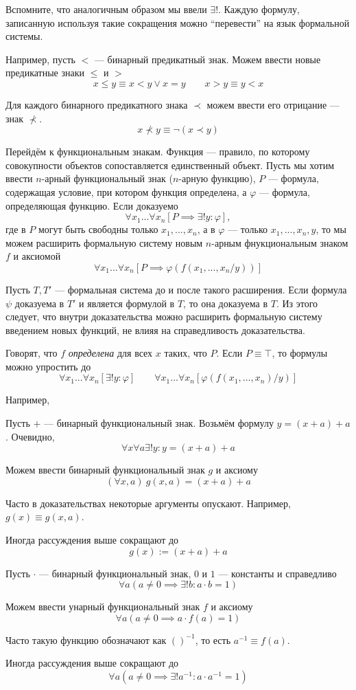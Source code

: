 Вспомните, что аналогичным образом мы ввели $\exists!$. Каждую формулу,
записанную используя такие сокращения можно
``перевести'' на язык формальной системы.

Например, пусть $<$ --- бинарный предикатный знак.
Можем ввести новые предикатные знаки $\leq$ и $>$
\[
	x\leq y\equiv x<y\lor x=y\qquad x>y\equiv y< x
\]

Для каждого бинарного предикатного знака $\prec$ можем
ввести его отрицание --- знак $\nprec$.
\[
	x\nprec y\equiv \lnot(x\prec y)
\]

Перейдём к функциональным знакам. Функция --- правило, по которому совокупности
объектов сопоставляется единственный объект. Пусть мы хотим ввести $n$-арный
функциональный знак ($n$-арную функцию), $P$ --- формула, содержащая
условие, при котором функция определена, а $\varphi$ --- формула, определяющая
функцию. Если доказуемо
\[
	\forall x_1...\forall x_n[P\implies \exists! y:\varphi],
\]
где в $P$ могут быть свободны только $x_1,...,x_{n}$, а в $\varphi$ --- только
$x_1,...,x_{n},y$,
то мы можем расширить формальную систему новым $n$-арным фнукциональным знаком $f$
и аксиомой
\[
	\forall x_1...\forall x_{n}[P\implies \varphi(f(x_1,...,x_{n}/y))]
\]

Пусть $T,T'$ --- формальная система до и после такого расширения.
Если формула $\psi$ доказуема в $T'$ и является формулой в $T$, то она доказуема в $T$.
Из этого следует, что внутри доказательства можно расширить формальную систему
введением новых функций, не влияя на справедливость доказательства.

Говорят, что $f$ {\it определена} для всех $x$ таких, что $P$.
Если $P\equiv \top$, то формулы можно упростить до
\[
	\forall x_1...\forall x_{n}[\exists !y:\varphi]\qquad
	\forall x_1...\forall x_{n}[\varphi(f(x_1,...,x_{n})/y)]
\]

\begin{fullwidth}
	Например,
	\begin{multicols}{2}
		Пусть $+$ --- бинарный функциональный знак.
		Возьмём формулу $y=(x+a)+a$. Очевидно,
		\[
			\forall x\forall a\exists !y:y=(x+a)+a
		\]

		Можем ввести бинарный функциональный знак $g$ и аксиому
		\[
			(\forall x,a)~g(x,a)=(x+a)+a
		\]

		Часто в доказательствах некоторые аргументы опускают.
		Например, $g(x)\equiv g(x,a)$.

		Иногда рассуждения выше сокращают до
		\[
			g(x):=(x+a)+a
		\]

		\columnbreak

		Пусть $\cdot$ --- бинарный функциональный знак,
		$0$ и $1$ --- константы и справедливо
		\[
			\forall a(a\neq 0\implies \exists !b:a\cdot b=1)
		\]

		Можем ввести унарный функциональный знак $f$ и аксиому
		\[
			\forall a(a\neq 0\implies a\cdot f(a)=1)
		\]

		Часто такую функцию обозначают как $()^{-1}$, то есть $a^{-1}\equiv f(a)$.

		Иногда рассуждения выше сокращают до
		\[
			\forall a(a\neq 0\implies \exists !a^{-1}:a\cdot a^{-1}=1)
		\]
	\end{multicols}
\end{fullwidth}

\pagebreak
